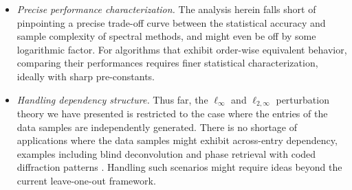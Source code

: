 \begin{itemize}


	\item {\em Precise performance characterization.} The analysis herein falls short of pinpointing a precise trade-off curve between the statistical accuracy and sample complexity of spectral methods, and might even be off by some logarithmic factor.  For algorithms that exhibit order-wise equivalent behavior,  comparing their performances requires finer statistical characterization, ideally with sharp pre-constants.




	\item {\em Handling dependency structure.} Thus far, the $\ell_{\infty}$ and $\ell_{2,\infty}$ perturbation theory we have presented  is restricted to the case where the entries of the data samples are independently generated. There is no shortage of applications where the data samples might exhibit across-entry dependency, examples including blind deconvolution \citep{ahmed2013blind} and phase retrieval with coded diffraction patterns \citep{candes2015CDP,gross2017improved}. Handling such scenarios might require ideas beyond the current leave-one-out framework.

	
		

		

\end{itemize}
